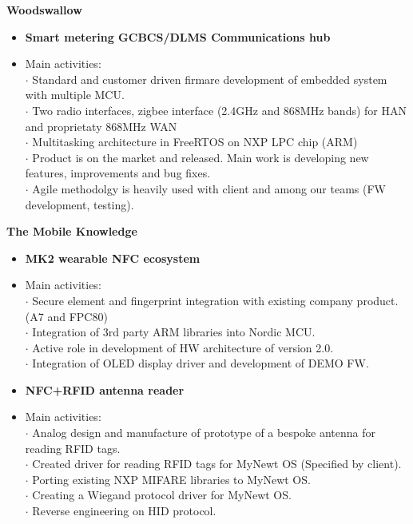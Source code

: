\documentclass[9pt]{extarticle}
\begin{document}
\textbf{Woodswallow}\\
\begin{itemize}
    \item[\textbf{}]{\textbf{Smart metering GCBCS/DLMS Communications hub}}
    \item[\textbf{}]{Main activities:}\\
    $\cdot${ Standard and customer driven firmare development of embedded system with multiple MCU.}\\
    $\cdot${ Two radio interfaces, zigbee interface (2.4GHz and 868MHz bands) for HAN and proprietaty 868MHz WAN}\\
    $\cdot${ Multitasking architecture in FreeRTOS on NXP LPC chip (ARM)}\\
    $\cdot${ Product is on the market and released. Main work is developing new features, improvements and bug fixes.}\\
    $\cdot${ Agile methodolgy is heavily used with client and among our teams (FW development, testing).}\\
\end{itemize}

\clearpage
\textbf{The Mobile Knowledge}\\
\begin{itemize}
    \item[\textbf{}]{\textbf{MK2 wearable NFC ecosystem}}
    \item[\textbf{}]{Main activities:}\\
    $\cdot${ Secure element and fingerprint integration with existing company product. (A7 and FPC80)}\\
    $\cdot${ Integration of 3rd party ARM libraries into Nordic MCU.}\\
    $\cdot${ Active role in development of HW architecture of version 2.0.}\\
    $\cdot${ Integration of OLED display driver and development of DEMO FW.}\\
\end{itemize}

\begin{itemize}
    \item[\textbf{}]{\textbf{NFC+RFID antenna reader}}
    \item[\textbf{}]{Main activities:}\\
    $\cdot${ Analog design and manufacture of prototype of a bespoke antenna for reading RFID tags.}\\
    $\cdot${ Created driver for reading RFID tags for MyNewt OS (Specified by client).}\\
    $\cdot${ Porting existing NXP MIFARE libraries to MyNewt OS.}\\
    $\cdot${ Creating a Wiegand protocol driver for MyNewt OS.}\\
    $\cdot${ Reverse engineering on HID protocol.}\\
\end{itemize}
\end{document}
